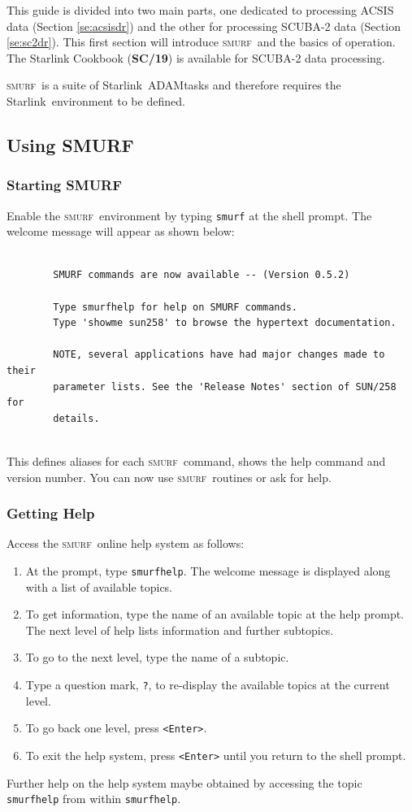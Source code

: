 \documentclass[twoside,11pt]{article}
\newcommand{\htmladdnormallink}[2]{#1}
\newcommand{\xref}[3]{#1}
\renewcommand{\_}{\texttt{\symbol{95}}}
\newcommand{\starlink}{\htmladdnormallink{Starlink}{http://starlink.jach.hawaii.edu}}
\newcommand{\SMURF}{\textsc{smurf}}
\newcommand{\ADAM}{\xref{ADAM}{sg4}}
\begin{document}
This guide is divided into two main parts, one dedicated to processing
ACSIS data (Section \ref{se:acsisdr}) and the other for processing
SCUBA-2 data (Section \ref{se:sc2dr}). This first section will
introduce \SMURF\ and the basics of operation. The Starlink Cookbook
(\xref{\textbf{SC/19}}{sc19}{}) is available for SCUBA-2 data
processing.

\SMURF\ is a suite of \starlink\ \ADAM\ tasks and therefore requires
the \starlink\ environment to be defined.

\subsection{Using SMURF}

\subsubsection{Starting SMURF}

Enable the \SMURF\ environment by typing \verb+smurf+ at the shell
prompt. The welcome message will appear as shown below:
\begin{verbatim}

        SMURF commands are now available -- (Version 0.5.2)

        Type smurfhelp for help on SMURF commands.
        Type 'showme sun258' to browse the hypertext documentation.

        NOTE, several applications have had major changes made to their
        parameter lists. See the 'Release Notes' section of SUN/258 for
        details.


\end{verbatim}
This defines aliases for each \SMURF\ command, shows the help command
and version number. You can now use \SMURF\ routines or ask for help.

\subsubsection{Getting Help}

Access the \SMURF\ online help system as follows:
\begin{enumerate}
\item At the prompt, type \verb+smurfhelp+. The welcome message is
  displayed along with a list of available topics.
\item To get information, type the name of an available topic at the
  help prompt.  The next level of help lists information and further
  subtopics.
\item To go to the next level, type the name of a subtopic.
\item Type a question mark, \verb+?+, to re-display the available
  topics at the current level.
\item To go back one level, press \verb+<Enter>+.
\item To exit the help system, press \verb+<Enter>+ until you return
  to the shell prompt.
\end{enumerate}
Further help on the help system maybe obtained by accessing the topic
\verb+smurfhelp+ from within \verb+smurfhelp+.
\end{document}
